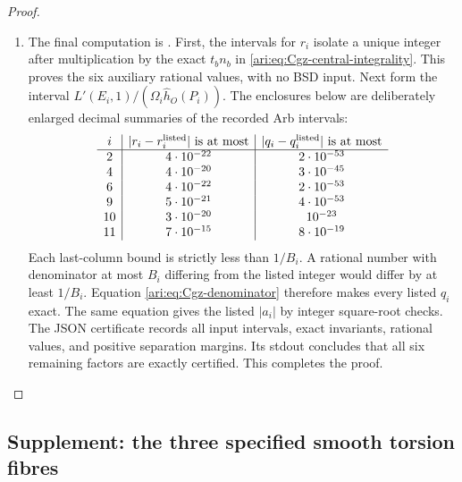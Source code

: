 \begin{proof}
\begin{enumerate}[label=\arabic*.,leftmargin=*]
\item The final computation is
. First, the intervals for
$r_i$ isolate a unique integer after multiplication by the exact
$t_bn_b$ in \eqref{ari:eq:Cgz-central-integrality}. This proves the
six auxiliary rational values, with no BSD input. Next form the
interval $L'(E_i,1)/(\Omega_i\widehat h_O(P_i))$. The enclosures
below are deliberately enlarged decimal summaries of the recorded
Arb intervals:
\[
\begin{array}{c|c|c}
 i&|r_i-r_i^{\rm listed}|\text{ is at most}
   &|q_i-q_i^{\rm listed}|\text{ is at most}\\\hline
 2&4\cdot10^{-22}&2\cdot10^{-53}\\
 4&4\cdot10^{-20}&3\cdot10^{-45}\\
 6&4\cdot10^{-22}&2\cdot10^{-53}\\
 9&5\cdot10^{-21}&4\cdot10^{-53}\\
 10&3\cdot10^{-20}&10^{-23}\\
 11&7\cdot10^{-15}&8\cdot10^{-19}
\end{array}
\]
Each last-column bound is strictly less than $1/B_i$. A rational
number with denominator at most $B_i$ differing from the listed
integer would differ by at least $1/B_i$. Equation
\eqref{ari:eq:Cgz-denominator} therefore makes every listed $q_i$
exact. The same equation gives the listed $|a_i|$ by integer
square-root checks. The JSON certificate records all input
intervals, exact invariants, rational values, and positive separation
margins. Its stdout concludes that all six remaining factors are
exactly certified. This completes the proof.
\end{enumerate}
\end{proof}


\subsection{Supplement: the three specified smooth torsion fibres}

